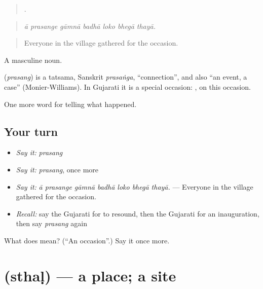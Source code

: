 \begin{quote}
      .
\end{quote}

\begin{quote}
\emph{ā prasange gāmnā badhā loko bhegā thayā.}
\end{quote}

\begin{quote}
Everyone in the village gathered for the occasion.
\end{quote}

A masculine noun.

\begin{cousinweb}
\textbf{} (\emph{prasang}) is a tatsama, Sanskrit \emph{prasaṅga}, \textquotedblleft{}connection\textquotedblright{}, and also \textquotedblleft{}an event, a case\textquotedblright{} (Monier-Williams). In Gujarati it is a special occasion: \textbf{ }, on this occasion.
\end{cousinweb}

\begin{grammarlens}[title={What you've built}]
One more word for telling what happened.
\end{grammarlens}

\subsection*{Your turn}
\begin{itemize}
\raggedright
  \item \emph{Say it:} \emph{prasang}
  \item \emph{Say it:} \emph{prasang}, once more
  \item \emph{Say it:} \emph{ā prasange gāmnā badhā loko bhegā thayā.} — Everyone in the village gathered for the occasion.
  \item \emph{Recall:} say the Gujarati for to resound, then the Gujarati for an inauguration, then say \emph{prasang} again
\end{itemize}

\begin{tcolorbox}[breakable,colback=teal!4,colframe=teal!35!black,title={Before you move on}]
What does  mean? (\textquotedblleft{}An occasion\textquotedblright{}.) Say it once more.
\end{tcolorbox}
\section[\texorpdfstring{\gu{સ્થળ} (sthaḷ)}{સ્થળ (sthaḷ)}]{ (sthaḷ) — a place; a site}

